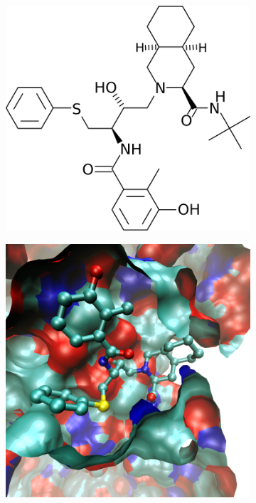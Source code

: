 \begin{figure}[h]
    \centering
    \begin{subfigure}[b]{0.3\textwidth}
        \centering
        \includegraphics[width=\textwidth]{figures/nelfinavir_small.png}
        \label{fig:nelfinavir_chemical}
        \caption{}
    \end{subfigure}%
    \hspace{0.1\textwidth}
    \begin{subfigure}[b]{0.3\textwidth}
        \centering
        \includegraphics[width=\textwidth]{figures/complexed_nelfinavir_white.png}

\end{subfigure}
\end{figure}
